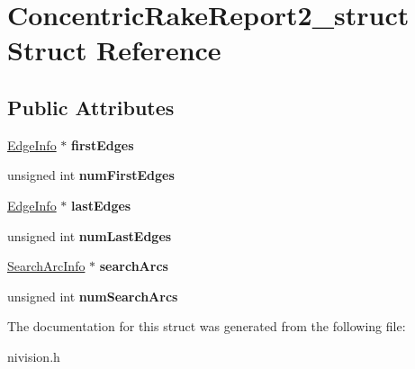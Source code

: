 \hypertarget{structConcentricRakeReport2__struct}{\section{\-Concentric\-Rake\-Report2\-\_\-struct \-Struct \-Reference}
\label{structConcentricRakeReport2__struct}
}
\subsection*{\-Public \-Attributes}
\begin{DoxyCompactItemize}
\item 
\hypertarget{structConcentricRakeReport2__struct_a15ccf386cbd51efa0870066fc1e407c8}{\hyperlink{structEdgeInfo__struct}{\-Edge\-Info} $\ast$ {\bfseries first\-Edges}}\label{structConcentricRakeReport2__struct_a15ccf386cbd51efa0870066fc1e407c8}

\item 
\hypertarget{structConcentricRakeReport2__struct_add55befce798755f1cdf2d28df77b418}{unsigned int {\bfseries num\-First\-Edges}}\label{structConcentricRakeReport2__struct_add55befce798755f1cdf2d28df77b418}

\item 
\hypertarget{structConcentricRakeReport2__struct_a18df492087e5545d4c81652c89fb916e}{\hyperlink{structEdgeInfo__struct}{\-Edge\-Info} $\ast$ {\bfseries last\-Edges}}\label{structConcentricRakeReport2__struct_a18df492087e5545d4c81652c89fb916e}

\item 
\hypertarget{structConcentricRakeReport2__struct_a2b8d26147e82b10efedddb3b82bcb018}{unsigned int {\bfseries num\-Last\-Edges}}\label{structConcentricRakeReport2__struct_a2b8d26147e82b10efedddb3b82bcb018}

\item 
\hypertarget{structConcentricRakeReport2__struct_aab81e505c0b516a9d2b63577292a2a71}{\hyperlink{structSearchArcInfo__struct}{\-Search\-Arc\-Info} $\ast$ {\bfseries search\-Arcs}}\label{structConcentricRakeReport2__struct_aab81e505c0b516a9d2b63577292a2a71}

\item 
\hypertarget{structConcentricRakeReport2__struct_a4268ee05d53170df3860f9d8087ef7bb}{unsigned int {\bfseries num\-Search\-Arcs}}\label{structConcentricRakeReport2__struct_a4268ee05d53170df3860f9d8087ef7bb}

\end{DoxyCompactItemize}


\-The documentation for this struct was generated from the following file\-:\begin{DoxyCompactItemize}
\item 
nivision.\-h\end{DoxyCompactItemize}
